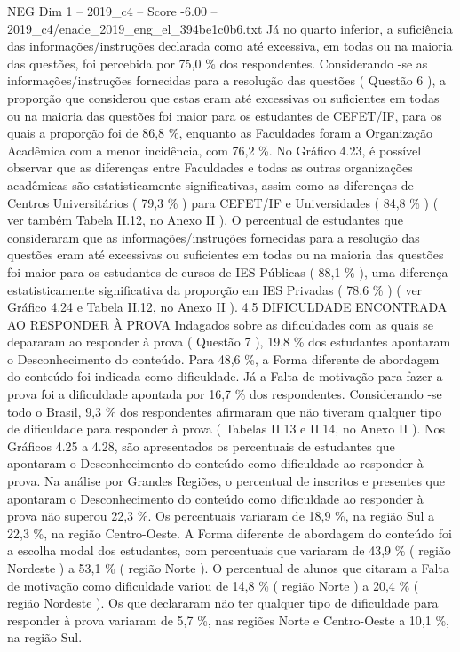 \begin{textsample}{NEG Dim 1 – 2019\_c4 – Score -6.00 – 2019\_c4/enade\_2019\_eng\_el\_394be1c0b6.txt}
Já no quarto inferior, a suficiência das informações/instruções declarada como até excessiva, em todas ou na maioria das questões, foi percebida por 75,0 \% dos respondentes.
Considerando -se as informações/instruções fornecidas para a resolução das questões ( Questão 6 ), a proporção que considerou que estas eram até excessivas ou suficientes em todas ou na maioria das questões foi maior para os estudantes de CEFET/IF, para os quais a proporção foi de 86,8 \%, enquanto as Faculdades foram a Organização Acadêmica com a menor incidência, com 76,2 \%.
No Gráfico 4.23, é possível observar que as diferenças entre Faculdades e todas as outras organizações acadêmicas são estatisticamente significativas, assim como as diferenças de Centros Universitários ( 79,3 \% ) para CEFET/IF e Universidades ( 84,8 \% ) ( ver também Tabela II.12, no Anexo II ).
O percentual de estudantes que consideraram que as informações/instruções fornecidas para a resolução das questões eram até excessivas ou suficientes em todas ou na maioria das questões foi maior para os estudantes de cursos de IES Públicas ( 88,1 \% ), uma diferença estatisticamente significativa da proporção em IES Privadas ( 78,6 \% ) ( ver Gráfico 4.24 e Tabela II.12, no Anexo II ). 4.5 DIFICULDADE ENCONTRADA AO RESPONDER À PROVA Indagados sobre as dificuldades com as quais se depararam ao responder à prova ( Questão 7 ), 19,8 \% dos estudantes apontaram o Desconhecimento do conteúdo.
Para 48,6 \%, a Forma diferente de abordagem do conteúdo foi indicada como dificuldade.
Já a Falta de motivação para fazer a prova foi a dificuldade apontada por 16,7 \% dos respondentes.
Considerando -se todo o Brasil, 9,3 \% dos respondentes afirmaram que não tiveram qualquer tipo de dificuldade para responder à prova ( Tabelas II.13 e II.14, no Anexo II ).
Nos Gráficos 4.25 a 4.28, são apresentados os percentuais de estudantes que apontaram o Desconhecimento do conteúdo como dificuldade ao responder à prova.
Na análise por Grandes Regiões, o percentual de inscritos e presentes que apontaram o Desconhecimento do conteúdo como dificuldade ao responder à prova não superou 22,3 \%.
Os percentuais variaram de 18,9 \%, na região Sul a 22,3 \%, na região Centro-Oeste.
A Forma diferente de abordagem do conteúdo foi a escolha modal dos estudantes, com percentuais que variaram de 43,9 \% ( região Nordeste ) a 53,1 \% ( região Norte ).
O percentual de alunos que citaram a Falta de motivação como dificuldade variou de 14,8 \% ( região Norte ) a 20,4 \% ( região Nordeste ).
Os que declararam não ter qualquer tipo de dificuldade para responder à prova variaram de 5,7 \%, nas regiões Norte e Centro-Oeste a 10,1 \%, na região Sul.

\end{textsample}
